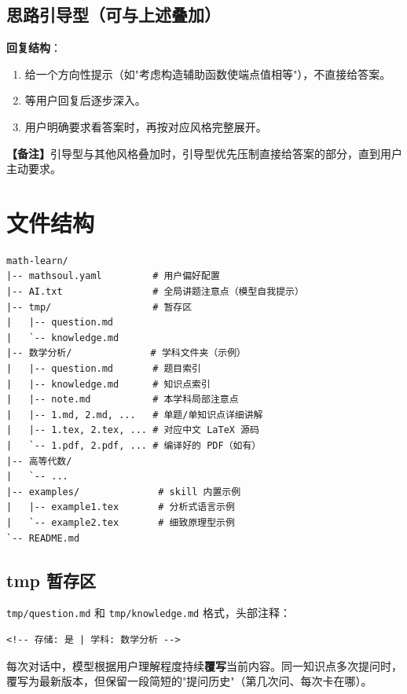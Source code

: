 \documentclass[12pt,a4paper]{ctexart}
\newcommand{\style}[1]{\textcolor{B}{\textbf{#1}}}
\newcommand{\note}[1]{\textcolor{G}{\textbf{【备注】}#1}}
\begin{document}
\subsection{\style{思路引导型}（可与上述叠加）}

\textbf{回复结构}：
\begin{enumerate}
  \item 给一个方向性提示（如"考虑构造辅助函数使端点值相等"），不直接给答案。
  \item 等用户回复后逐步深入。
  \item 用户明确要求看答案时，再按对应风格完整展开。
\end{enumerate}

\note{引导型与其他风格叠加时，引导型优先压制直接给答案的部分，直到用户主动要求。}

\section{文件结构}

\begin{lstlisting}
math-learn/
|-- mathsoul.yaml         # 用户偏好配置
|-- AI.txt                # 全局讲题注意点（模型自我提示）
|-- tmp/                  # 暂存区
|   |-- question.md
|   `-- knowledge.md
|-- 数学分析/              # 学科文件夹（示例）
|   |-- question.md       # 题目索引
|   |-- knowledge.md      # 知识点索引
|   |-- note.md           # 本学科局部注意点
|   |-- 1.md, 2.md, ...   # 单题/单知识点详细讲解
|   |-- 1.tex, 2.tex, ... # 对应中文 LaTeX 源码
|   `-- 1.pdf, 2.pdf, ... # 编译好的 PDF（如有）
|-- 高等代数/
|   `-- ...
|-- examples/              # skill 内置示例
|   |-- example1.tex       # 分析式语言示例
|   `-- example2.tex       # 细致原理型示例
`-- README.md
\end{lstlisting}

\subsection{tmp 暂存区}

\texttt{tmp/question.md} 和 \texttt{tmp/knowledge.md} 格式，头部注释：
\begin{lstlisting}
<!-- 存储: 是 | 学科: 数学分析 -->
\end{lstlisting}

每次对话中，模型根据用户理解程度持续\textbf{覆写}当前内容。同一知识点多次提问时，覆写为最新版本，但保留一段简短的"提问历史"（第几次问、每次卡在哪）。
\end{document}
